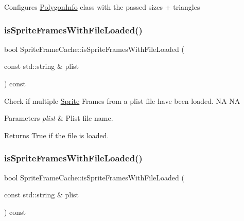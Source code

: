 Configures \hyperlink{classPolygonInfo}{Polygon\+Info} class with the passed sizes + triangles \mbox{\label{classSpriteFrameCache_a9f5b03798546f9a18112feebe8e074eb}} 
\subsubsection{\texorpdfstring{is\+Sprite\+Frames\+With\+File\+Loaded()}{isSpriteFramesWithFileLoaded()}\hspace{0.1cm}{\footnotesize\ttfamily [1/2]}}
{\footnotesize\ttfamily bool Sprite\+Frame\+Cache\+::is\+Sprite\+Frames\+With\+File\+Loaded (\begin{DoxyParamCaption}\item[{const std\+::string \&}]{plist }\end{DoxyParamCaption}) const}

Check if multiple \hyperlink{classSprite}{Sprite} Frames from a plist file have been loaded.  NA  NA


\begin{DoxyParams}{Parameters}
{\em plist} & Plist file name. \\
\hline
\end{DoxyParams}
\begin{DoxyReturn}{Returns}
True if the file is loaded. 
\end{DoxyReturn}
\mbox{\label{classSpriteFrameCache_a9f5b03798546f9a18112feebe8e074eb}} 
\subsubsection{\texorpdfstring{is\+Sprite\+Frames\+With\+File\+Loaded()}{isSpriteFramesWithFileLoaded()}\hspace{0.1cm}{\footnotesize\ttfamily [2/2]}}
{\footnotesize\ttfamily bool Sprite\+Frame\+Cache\+::is\+Sprite\+Frames\+With\+File\+Loaded (\begin{DoxyParamCaption}\item[{const std\+::string \&}]{plist }\end{DoxyParamCaption}) const}

